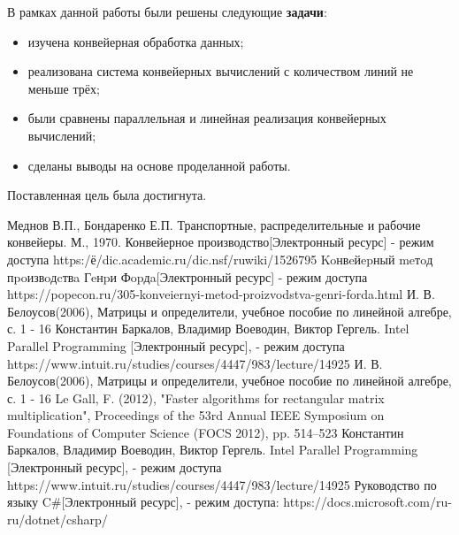 \documentclass[12pt]{report}
\begin{document}
В рамках данной работы были решены следующие \textbf{задачи}:

\begin{itemize}
	\item изучена конвейерная обработка данных;
	\item реализована система конвейерных вычислений с количеством линий не меньше трёх;
	\item были сравнены параллельная и линейная реализация конвейерных вычислений;
	\item сделаны выводы на основе проделанной работы.
\end{itemize}

Поставленная цель была достигнута.

\newpage
{}
\renewcommand\bibname{Список литературы}
\begin{thebibliography}{3}
	 Меднов В.П., Бондаренко Е.П. Транспортные, распределительные и рабочие конвейеры. М., 1970.
	 Конвейерное производство[Электронный ресурс] - режим доступа https:/ё/dic.academic.ru/dic.nsf/ruwiki/1526795
	 Koнвeйepный meтoд пpoизвoдcтвa Гeнpи Фopдa[Электронный ресурс] - режим доступа https://popecon.ru/305-konveiernyi-metod-proizvodstva-genri-forda.html
	 И. В. Белоусов(2006), Матрицы и определители, учебное пособие по линейной алгебре, с. 1 - 16
	 Константин Баркалов, Владимир Воеводин, Виктор Гергель. Intel Parallel Programming [Электронный ресурс], - режим доступа https://www.intuit.ru/studies/courses/4447/983/lecture/14925
	 И. В. Белоусов(2006), Матрицы и определители, учебное пособие по линейной алгебре, с. 1 - 16
	 Le Gall, F. (2012), "Faster algorithms for rectangular matrix multiplication", Proceedings of the 53rd Annual IEEE Symposium on Foundations of Computer Science (FOCS 2012), pp. 514–523
	 Константин Баркалов, Владимир Воеводин, Виктор Гергель. Intel Parallel Programming [Электронный ресурс], - режим доступа https://www.intuit.ru/studies/courses/4447/983/lecture/14925
	 Руководство по языку C\#[Электронный ресурс], - режим доступа: https://docs.microsoft.com/ru-ru/dotnet/csharp/
\end{thebibliography}
\end{document}
